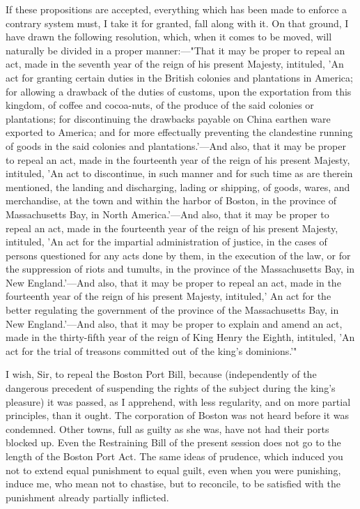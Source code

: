 If these propositions are accepted, everything which has been made to enforce a contrary system must, I take it for granted, fall along with it. On that ground, I have drawn the following resolution, which, when it comes to be moved, will naturally be divided in a proper manner:—"That it may be proper to repeal an act, made in the seventh year of the reign of his present Majesty, intituled, 'An act for granting certain duties in the British colonies and plantations in America; for allowing a drawback of the duties of customs, upon the exportation from this kingdom, of coffee and cocoa-nuts, of the produce of the said colonies or plantations; for discontinuing the drawbacks payable on China earthen ware exported to America; and for more effectually preventing the clandestine running of goods in the said colonies and plantations.'—And also, that it may be proper to repeal an act, made in the fourteenth year of the reign of his present Majesty, intituled, 'An act to discontinue, in such manner and for such time as are therein mentioned, the landing and discharging, lading or shipping, of goods, wares, and merchandise, at the town and within the harbor of Boston, in the province of Massachusetts Bay, in North America.'—And also, that it may be proper to repeal an act, made in the fourteenth year of the reign of his present Majesty, intituled, 'An act for the impartial administration of justice, in the cases of persons questioned for any acts done by them, in the execution of the law, or for the suppression of riots and tumults, in the province of the Massachusetts Bay, in New England.'—And also, that it may be proper to repeal an act, made in the fourteenth year of the reign of his present Majesty, intituled,' An act for the better regulating the government of the province of the Massachusetts Bay, in New England.'—And also, that it may be proper to explain and amend an act, made in the thirty-fifth year of the reign of King Henry the Eighth, intituled, 'An act for the trial of treasons committed out of the king's dominions.'"

I wish, Sir, to repeal the Boston Port Bill, because (independently of the dangerous precedent of suspending the rights of the subject during the king's pleasure) it was passed, as I apprehend, with less regularity, and on more partial principles, than it ought. The corporation of Boston was not heard before it was condemned. Other towns, full as guilty as she was, have not had their ports blocked up. Even the Restraining Bill of the present session does not go to the length of the Boston Port Act. The same ideas of prudence, which induced you not to extend equal punishment to equal guilt, even when you were punishing, induce me, who mean not to chastise, but to reconcile, to be satisfied with the punishment already partially inflicted.

